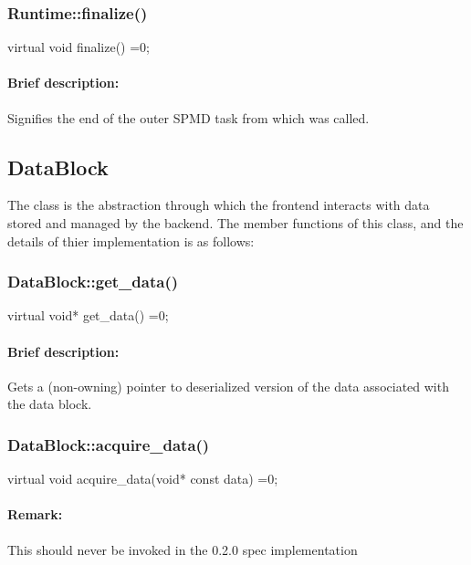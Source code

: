 \subsubsection{Runtime::finalize()}
\begin{CppCode}
    virtual void
    finalize() =0;
\end{CppCode}

\paragraph{Brief description:} Signifies the end of the outer SPMD task from which  was called.
     



\subsection{{DataBlock}}

The  class is the abstraction through which the frontend interacts with data stored and managed by the backend. The 
member functions of this class, and the details of thier implementation is as follows:

\subsubsection{DataBlock::get\_data()}
\begin{CppCode}
    virtual void*
    get_data() =0;
\end{CppCode}

\paragraph{Brief description:} Gets a (non-owning) pointer to deserialized version of the data associated with
      the data block.


\subsubsection{DataBlock::acquire\_data()}
\begin{CppCode}
    virtual void
    acquire_data(void* const data) =0;
\end{CppCode}

\paragraph{Remark:} This should never be invoked in the 0.2.0 spec implementation


